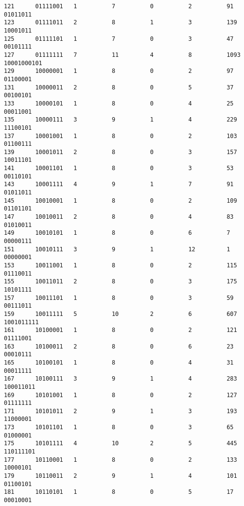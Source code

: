 \documentclass[10pt,letterpaper]{article}
\begin{document}
\begin{lstlisting}
121      01111001   1          7          0          2          91       01011011  
123      01111011   2          8          1          3          139      10001011  
125      01111101   1          7          0          3          47       00101111  
127      01111111   7          11         4          8          1093     10001000101
129      10000001   1          8          0          2          97       01100001  
131      10000011   2          8          0          5          37       00100101  
133      10000101   1          8          0          4          25       00011001  
135      10000111   3          9          1          4          229      11100101  
137      10001001   1          8          0          2          103      01100111  
139      10001011   2          8          0          3          157      10011101  
141      10001101   1          8          0          3          53       00110101  
143      10001111   4          9          1          7          91       01011011  
145      10010001   1          8          0          2          109      01101101  
147      10010011   2          8          0          4          83       01010011  
149      10010101   1          8          0          6          7        00000111  
151      10010111   3          9          1          12         1        00000001  
153      10011001   1          8          0          2          115      01110011  
155      10011011   2          8          0          3          175      10101111  
157      10011101   1          8          0          3          59       00111011  
159      10011111   5          10         2          6          607      1001011111
161      10100001   1          8          0          2          121      01111001  
163      10100011   2          8          0          6          23       00010111  
165      10100101   1          8          0          4          31       00011111  
167      10100111   3          9          1          4          283      100011011 
169      10101001   1          8          0          2          127      01111111  
171      10101011   2          9          1          3          193      11000001  
173      10101101   1          8          0          3          65       01000001  
175      10101111   4          10         2          5          445      110111101 
177      10110001   1          8          0          2          133      10000101  
179      10110011   2          9          1          4          101      01100101  
181      10110101   1          8          0          5          17       00010001  

\end{lstlisting}
\end{document}
